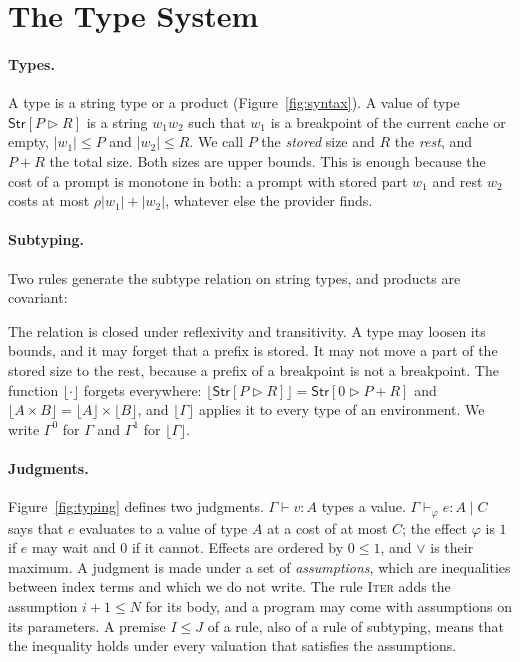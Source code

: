 \documentclass[acmsmall,nonacm,screen]{acmart}
\newcommand{\kw}[1]{\mathsf{#1}}
\newcommand{\Str}[2]{\kw{Str}[#1 \triangleright #2]}
\newcommand{\fl}[1]{\lfloor #1 \rfloor}
\begin{document}
\section{The Type System}
\label{sec:types}

\paragraph{Types.} A type is a string type or a product (Figure~\ref{fig:syntax}). A value of
type $\Str{P}{R}$ is a string $w_1w_2$ such that $w_1$ is a breakpoint of the current cache or
empty, $|w_1| \le P$ and $|w_2| \le R$. We call $P$ the \emph{stored} size and $R$ the
\emph{rest}, and $P + R$ the total size. Both sizes are upper bounds. This is enough because
the cost of a prompt is monotone in both: a prompt with stored part $w_1$ and rest $w_2$ costs
at most $\rho|w_1| + |w_2|$, whatever else the provider finds.

\paragraph{Subtyping.} Two rules generate the subtype relation on string types, and products
are covariant:
The relation is closed under reflexivity and transitivity. A type may loosen its bounds, and it
may forget that a prefix is stored. It may not move a part of the stored size to the rest,
because a prefix of a breakpoint is not a breakpoint. The function $\fl{\cdot}$ forgets
everywhere: $\fl{\Str{P}{R}} = \Str{0}{P+R}$ and $\fl{A \times B} = \fl{A} \times \fl{B}$, and
$\fl{\Gamma}$ applies it to every type of an environment. We write $\Gamma^0$ for $\Gamma$ and
$\Gamma^1$ for $\fl{\Gamma}$.

\paragraph{Judgments.} Figure~\ref{fig:typing} defines two judgments. $\Gamma \vdash v : A$
types a value. $\Gamma \vdash_\varphi e : A \mid C$ says that $e$ evaluates to a value of type
$A$ at a cost of at most $C$; the effect $\varphi$ is $1$ if $e$ may wait and $0$ if it
cannot. Effects are ordered by $0 \le 1$, and $\vee$ is their maximum. A judgment is made under a set of \emph{assumptions}, which are
inequalities between index terms and which we do not write. The rule \textsc{Iter} adds the
assumption $i + 1 \le N$ for its body, and a program may come with assumptions on its
parameters. A premise $I \le J$ of a rule, also of a rule of subtyping, means that the
inequality holds under every valuation that satisfies the assumptions.
\end{document}

